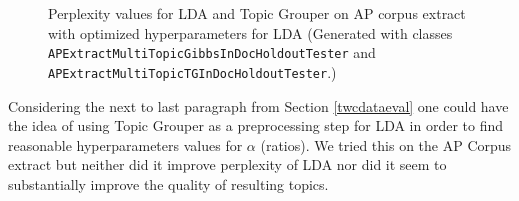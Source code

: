 \documentclass[10pt, a4paper, oneside]{article}
\begin{document}
\begin{figure}
\caption{Perplexity values for LDA and Topic Grouper on AP corpus extract with optimized hyperparameters for LDA (Generated with classes \texttt{APExtractMultiTopicGibbsInDocHoldoutTester} and \texttt{APExtractMultiTopicTGInDocHoldoutTester}.)}
\label{perplexity7}
\end{figure}

Considering the next to last paragraph from Section \ref{twcdataeval} one could have the idea of using Topic Grouper as a preprocessing step for LDA in order to find reasonable hyperparameters values for $\alpha$ (ratios). We tried this on the AP Corpus extract but neither did it improve perplexity of LDA nor did it seem to substantially improve the quality of resulting topics. 
\end{document}
